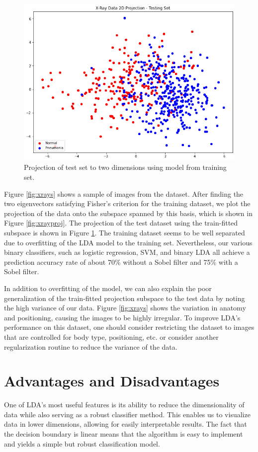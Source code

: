 \documentclass[letterpaper, 10 pt, conference]{ieeeconf}  %
\begin{document}
\begin{figure}
    \centering
    \includegraphics[width=\columnwidth]{figs/X-rayprojtest.png}
    \caption{Projection of test set to two dimensions using model from training set.}
    \label{fig:xrayprojtest}
\end{figure}
Figure \ref{fig:xrays} shows a sample of images from the dataset. After finding the two eigenvectors satisfying Fisher's criterion for the training dataset, we plot the projection of the data onto the subspace spanned by this basis, which is shown in Figure \ref{fig:xrayproj}. The projection of the test dataset using the train-fitted subspace is shown in Figure \ref{fig:xrayprojtest}. The training dataset seems to be well separated due to overfitting of the LDA model to the training set. Nevertheless, our various binary classifiers, such as logistic regression, SVM, and binary LDA all achieve a prediction accuracy rate of about 70\% without a Sobel filter and 75\% with a Sobel filter.

In addition to overfitting of the model, we can also explain the poor generalization of the train-fitted projection subspace to the test data by noting the high variance of our data.
Figure \ref{fig:xrays} shows the variation in anatomy and positioning, causing the images to be highly irregular.
To improve LDA's performance on this dataset, one should consider restricting the dataset to images that are controlled for body type, positioning, etc. or consider another regularization routine to reduce the variance of the data.


\section{Advantages and Disadvantages}\label{sec:Advantages and Disadvantages}
One of LDA's most useful features is its ability to reduce the dimensionality of data while also serving as a robust classifier method. This enables us to visualize data in lower dimensions, allowing for easily interpretable results. 
The fact that the decision boundary is linear means that the algorithm is easy to implement and yields a simple but robust classification model.
\end{document}
